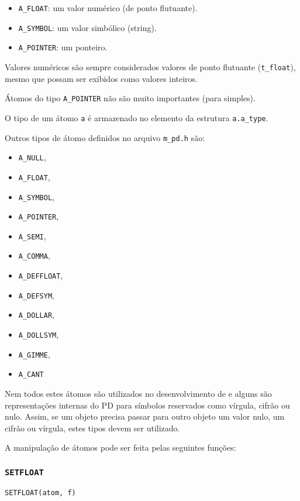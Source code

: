 \begin{itemize}
\item \texttt{A\_FLOAT}: um valor numérico (de ponto flutuante).
\item \texttt{A\_SYMBOL}: um valor simbólico (string).
\item \texttt{A\_POINTER}: um ponteiro.
\end{itemize}


Valores numéricos são sempre considerados valores de ponto flutuante
(\texttt{t\_float}), mesmo que possam ser exibidos como valores inteiros.

Átomos do tipo \texttt{A\_POINTER} não são muito importantes (para \externals
simples).

O tipo de um átomo \texttt{a} é armazenado no elemento da estrutura
\texttt{a.a\_type}.

Outros tipos de átomo definidos no arquivo \texttt{m\_pd.h} são:

\begin{itemize}
\item \texttt{A\_NULL},
\item \texttt{A\_FLOAT},
\item \texttt{A\_SYMBOL},
\item \texttt{A\_POINTER},
\item \texttt{A\_SEMI},
\item \texttt{A\_COMMA},
\item \texttt{A\_DEFFLOAT},
\item \texttt{A\_DEFSYM},
\item \texttt{A\_DOLLAR},
\item \texttt{A\_DOLLSYM},
\item \texttt{A\_GIMME},
\item \texttt{A\_CANT}
\end{itemize}

Nem todos estes átomos são utilizados no desenvolvimento de \externals e alguns
são representações internas do PD para símbolos reservados como vírgula, cifrão
ou nulo.
Assim, se um objeto precisa passar para outro objeto um valor nulo, um cifrão ou
vírgula, estes tipos devem ser utilizado.

A manipulação de átomos pode ser feita pelas seguintes funções:

\subsubsection{\texttt{SETFLOAT}}
\texttt{SETFLOAT(atom, f)}

